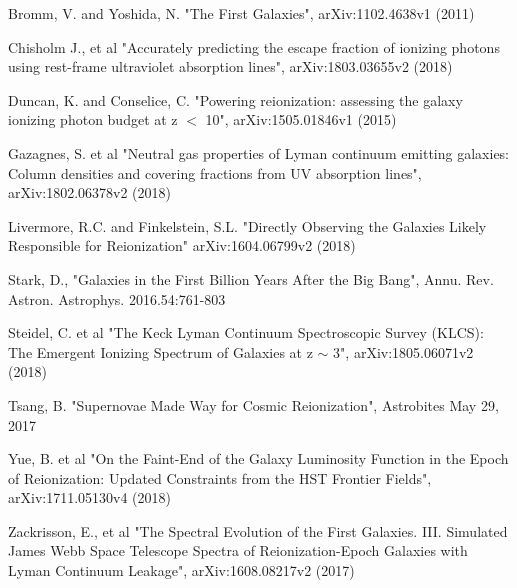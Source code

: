 \documentclass{aastex62}
\begin{document}
\begin{thebibliography}{}
Bromm, V. and Yoshida, N. "The First Galaxies", arXiv:1102.4638v1 (2011)

Chisholm J., et al "Accurately predicting the escape fraction of ionizing photons using rest-frame ultraviolet absorption lines", arXiv:1803.03655v2 (2018)

Duncan, K. and Conselice, C. "Powering reionization: assessing the galaxy ionizing photon budget at z $<$ 10", arXiv:1505.01846v1 (2015)

Gazagnes, S. et al "Neutral gas properties of Lyman continuum emitting galaxies: Column densities and covering fractions from UV absorption lines", arXiv:1802.06378v2 (2018)

Livermore, R.C. and Finkelstein, S.L. "Directly Observing the Galaxies Likely Responsible for Reionization" arXiv:1604.06799v2 (2018)

Stark, D., "Galaxies in the First Billion Years After the Big Bang", Annu. Rev. Astron. Astrophys. 2016.54:761-803

Steidel, C. et al "The Keck Lyman Continuum Spectroscopic Survey (KLCS): The Emergent Ionizing Spectrum of Galaxies at z $\sim$ 3", arXiv:1805.06071v2 (2018)

Tsang, B. "Supernovae Made Way for Cosmic Reionization", Astrobites May 29, 2017

Yue, B. et al "On the Faint-End of the Galaxy Luminosity Function in the Epoch of Reionization: Updated Constraints from the HST Frontier Fields", arXiv:1711.05130v4 (2018)

Zackrisson, E., et al "The Spectral Evolution of the First Galaxies. III. Simulated James Webb Space Telescope Spectra of Reionization-Epoch Galaxies with Lyman Continuum Leakage", arXiv:1608.08217v2 (2017)

\end{thebibliography}




\end{document}

